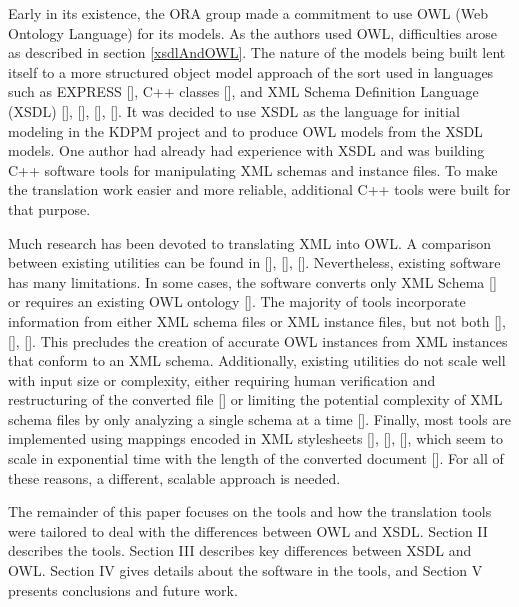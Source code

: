 \documentclass[preprint,12pt]{elsarticle}
\begin{document}
Early in its existence, the ORA group made a commitment to use OWL (Web
Ontology Language) for its models. As the authors used OWL, difficulties
arose as described in section \ref{xsdlAndOWL}. The nature of the models
being built lent itself to a more structured object model approach of the
sort used in languages such as EXPRESS [], C++ classes
[], and XML Schema Definition Language (XSDL)
[], [], [],
[]. It was decided to use XSDL as the language for
initial modeling in the KDPM project and to produce OWL models from the
XSDL models. One author had already had experience with XSDL and was
building C++ software tools for manipulating XML schemas and instance
files. To make the translation work easier and more reliable, additional
C++ tools were built for that purpose.

Much research has been devoted to translating XML into OWL. A
comparison between existing utilities can be found in
[], [],
[]. Nevertheless, existing software has many
limitations. In some cases, the software converts only XML Schema
[] or requires an existing OWL ontology
[]. The majority of tools incorporate information
from either XML schema files or XML instance files, but not both
[], [], [].  This
precludes the creation of accurate OWL instances from XML instances
that conform to an XML schema.  Additionally, existing utilities do
not scale well with input size or complexity, either requiring human
verification and restructuring of the converted file []
or limiting the potential complexity of XML schema files by only
analyzing a single schema at a time []. Finally, most
tools are implemented using mappings encoded in XML stylesheets
[], [], [], which
seem to scale in exponential time with the length of the converted
document [].  For all of these reasons, a different,
scalable approach is needed.

The remainder of this paper focuses on the tools and how the translation
tools were tailored to deal with the differences between OWL and XSDL.
Section II describes the tools. Section III describes key differences
between XSDL and OWL. Section IV gives details about the software in the
tools, and Section V presents conclusions and future work.
\end{document}
